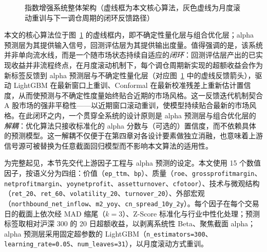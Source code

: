 \begin{figure}[htbp]
{%
}
\caption{指数增强系统整体架构（虚线框为本文核心算法，灰色虚线为月度滚动重训与下一调仓周期的闭环反馈路径）}
\label{fig:arch}
\end{figure}

本文的核心算法位于图~\ref{fig:arch} 的虚线框内，即不确定性量化层与组合优化层；alpha 预测层为其提供输入信号，回测评估层为其提供输出度量。值得强调的是，该系统并非单向流水线，而是一个随市场状态持续自适应的\emph{闭环}：回测评估层产出的已实现收益并非流程终点，在月度滚动机制下，每个调仓周期新实现的超额收益会作为新标签反馈到 alpha 预测层与不确定性量化层（对应图~\ref{fig:arch} 中的虚线反馈箭头），驱动 LightGBM 在最新窗口上重训、Conformal 在最新校准残差上重新估计置信度，从而使预测与不确定性度量始终贴合近期的市场风格。这一反馈迭代机制契合 A 股市场的强非平稳性——以近期窗口滚动重训，使模型持续贴合最新的市场风格。在此闭环之内，一个贯穿全系统的设计原则是 alpha 预测层与组合优化层的\emph{解耦}：优化算法只接收标准化的 alpha 分数与（可选的）置信度，而不依赖具体的预测模型。这一解耦不仅便于在第四章对各设计要素做独立消融，也意味着上游信号源可被替换为任意截面回归模型而不影响本文算法的适用性。

为完整起见，本节先交代上游因子工程与 alpha 预测的设定。本文使用 15 个数值因子，按语义分为四组：价值（\texttt{ep\_ttm}、\texttt{bp}）、质量（\texttt{roe}、\texttt{grossprofitmargin}、\texttt{netprofitmargin}、\texttt{yoynetprofit}、\texttt{assetturnover}、\texttt{cfotoor}）、技术与微观结构（\texttt{ret\_20}、\texttt{ret\_60}、\texttt{volatility\_20}、\texttt{turnover\_20}）、外部宏观（\texttt{northbound\_net\_inflow}、\texttt{m2\_yoy}、\texttt{cn\_spread\_10y\_2y}）。每个因子在每个交易日的截面上依次经 MAD 缩尾（$k=3$）、Z-Score 标准化与行业中性化处理；预测标签取相对沪深 300 的 20 日超额收益，以剥离系统性 Beta、聚焦截面 alpha；alpha 预测层采用固定超参数的 LightGBM（\texttt{n\_estimators=300}、\texttt{learning\_rate=0.05}、\texttt{num\_leaves=31}），以月度滚动方式重训。


